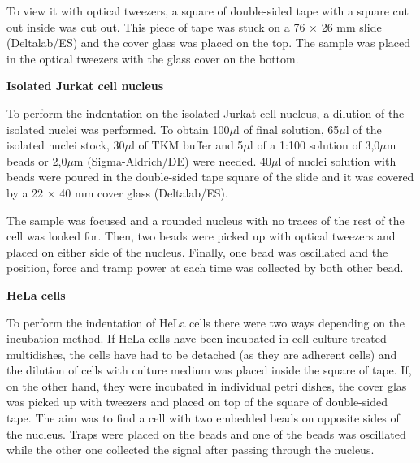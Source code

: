 \documentclass[12pt, a4paper]{article} %
\begin{document}
\setlength{\parskip}{4mm}

To view it with optical tweezers, a square of double-sided tape with a square cut out inside was cut out. This piece of tape was stuck on a 76 $\times$ 26 mm slide (Deltalab/ES) and the cover glass was placed on the top. The sample was placed in the optical tweezers with the glass cover on the bottom.

\setlength{\parindent}{0pt}

{\textbf{Isolated Jurkat cell nucleus}}

To perform the indentation on the isolated Jurkat cell nucleus, a dilution of the isolated nuclei was performed. To obtain 100$\mu$l of final solution, 65$\mu$l of the isolated nuclei stock, 30$\mu$l of TKM buffer and 5$\mu$l of a 1:100 solution of 3,0$\mu$m beads or 2,0$\mu$m (Sigma-Aldrich/DE) were needed. 40$\mu$l of nuclei solution with beads were poured in the double-sided tape square of the slide and it was covered by a 22 $\times$ 40 mm cover glass (Deltalab/ES).

\setlength{\parindent}{8pt}

The sample was focused and a rounded nucleus with no traces of the rest of the cell was looked for. Then, two beads were picked up with optical tweezers and placed on either side of the nucleus. Finally, one bead was oscillated and the position, force and tramp power at each time was collected by both other bead.

\setlength{\parindent}{0pt}

\newpage

{\textbf{HeLa cells}}

To perform the indentation of HeLa cells there were two ways depending on the incubation method. If HeLa cells have been incubated in cell-culture treated multidishes, the cells have had to be detached (as they are adherent cells) and the dilution of cells with culture medium was placed inside the square of tape. If, on the other hand, they were incubated in individual petri dishes, the cover glas was picked up with tweezers and placed on top of the square of double-sided tape. The aim was to find a cell with two embedded beads on opposite sides of the nucleus. Traps were placed on the beads and one of the beads was oscillated while the other one collected the signal after passing through the nucleus.
\end{document}
